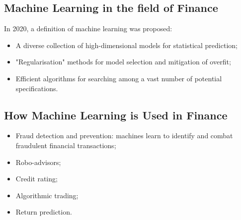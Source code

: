 \documentclass[11pt,a4paper]{report}
\begin{document}
\subsection{Machine Learning in the field of Finance}
In 2020, a definition of machine learning was proposed:
\begin{itemize}
    \item A diverse collection of high-dimensional models for statistical prediction;
    \item "Regularisation" methods for model selection and mitigation of overfit;
    \item Efficient algorithms for searching among a vast number of potential specifications.
\end{itemize}
\subsection{How Machine Learning is Used in Finance}
\begin{itemize}
    \item Fraud detection and prevention: machines learn to identify and combat fraudulent financial transactions;
    \item Robo-advisors;
    \item Credit rating;
    \item Algorithmic trading;
    \item Return prediction.
\end{itemize}
\end{document}
